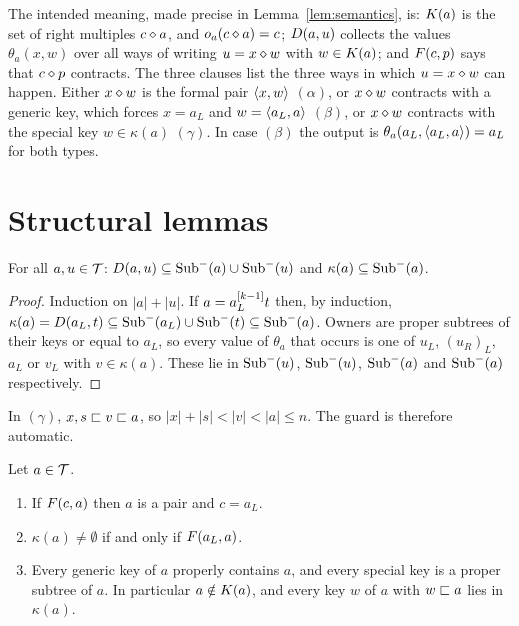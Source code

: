 The intended meaning, made precise in Lemma~\ref{lem:semantics}, is: $K(a)$
is the set of right multiples $c\mathbin{\diamond} a$, and $o_a(c\mathbin{\diamond} a)=c$; $D(a,u)$
collects the values $\theta_a(x,w)$ over all ways of writing $u=x\mathbin{\diamond} w$ with
$w\in K(a)$; and $F(c,p)$ says that $c\mathbin{\diamond} p$ contracts. The three clauses
list the three ways in which $u=x\mathbin{\diamond} w$ can happen. Either $x\mathbin{\diamond} w$ is the
formal pair $\langle x,w\rangle$ $(\alpha)$, or $x\mathbin{\diamond} w$ contracts with a generic key,
which forces $x=a_L$ and $w=\langle a_L,a\rangle$ $(\beta)$, or $x\mathbin{\diamond} w$ contracts with
the special key $w\in\kappa(a)$ $(\gamma)$. In case $(\beta)$ the output is
$\theta_a(a_L,\langle a_L,a\rangle)=a_L$ for both types.

\section{Structural lemmas}\label{sec:lemmas}

\begin{lemma}\label{lem:sub}
For all $a,u\in\mathcal{T}$:
$D(a,u)\subseteq\operatorname{Sub}^{-}(a)\cup\operatorname{Sub}^{-}(u)$ and $\kappa(a)\subseteq\operatorname{Sub}^{-}(a)$.
\end{lemma}

\begin{proof}
Induction on $|a|+|u|$. If $a=a_L^{[k-1]}t$ then, by induction,
$\kappa(a)=D(a_L,t)\subseteq\operatorname{Sub}^{-}(a_L)\cup\operatorname{Sub}^{-}(t)\subseteq\operatorname{Sub}^{-}(a)$. Owners
are proper subtrees of their keys or equal to $a_L$, so every value of
$\theta_a$ that occurs is one of $u_L$, $(u_R)_L$, $a_L$ or $v_L$ with
$v\in\kappa(a)$. These lie in $\operatorname{Sub}^{-}(u)$, $\operatorname{Sub}^{-}(u)$, $\operatorname{Sub}^{-}(a)$ and $\operatorname{Sub}^{-}(a)$
respectively.
\end{proof}

\begin{remark}\label{rem:guard}
In $(\gamma)$, $x,s\sqsubset v\sqsubset a$, so $|x|+|s|<|v|<|a|\le n$. The guard is
therefore automatic.
\end{remark}

\begin{lemma}[Keys]\label{lem:keys}
Let $a\in\mathcal{T}$.
\begin{enumerate}[label=\textup{(\alph*)}]
\item If $F(c,a)$ then $a$ is a pair and $c=a_L$.
\item $\kappa(a)\neq\emptyset$ if and only if $F(a_L,a)$.
\item Every generic key of $a$ properly contains $a$, and every special key is
  a proper subtree of $a$. In particular $a\notin K(a)$, and every key
  $w$ of $a$ with $w\sqsubset a$ lies in $\kappa(a)$.
\end{enumerate}
\end{lemma}

